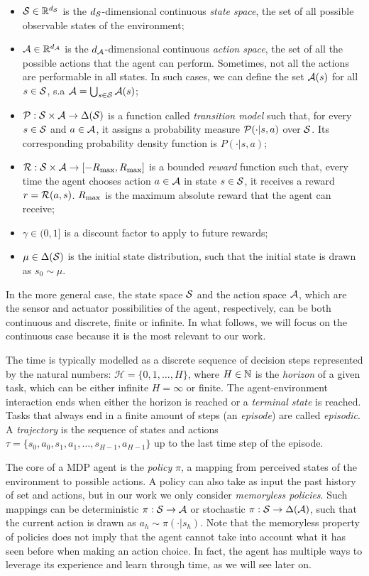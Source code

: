 \begin{itemize}
\item $\mathcal{S}\in\mathbb{R}^{d_{\mathcal{S}}}$ is the $d_{\mathcal{S}}$-dimensional continuous \emph{state space}, \ie the set of all possible observable states of the environment;
\item $\mathcal{A}\in\mathbb{R}^{d_{\mathcal{A}}}$ is the $d_{\mathcal{A}}$-dimensional continuous \emph{action space}, \ie the set of all the possible actions that the agent can perform. Sometimes, not all the actions are performable in all states. In such cases, we can define the set $\mathcal{A}(s)$ for all $s \in \mathcal{S}$, s.a  $\mathcal{A} = \bigcup_{s \in \mathcal{S}} \mathcal{A}(s)$;
\item  $\mathcal{P}:\mathcal{S}\times\mathcal{A}\to\Delta(\mathcal{S})$ is a function called \emph{transition model} such that, for every $s\in\mathcal{S}$ and $a\in\mathcal{A}$, it assigns a probability measure $\mathcal{P}(\cdot|s,a)$ over $\mathcal{S}$. Its corresponding probability density function is $P(\cdot|s,a)$;
\item $\mathcal{R}:\mathcal{S}\times\mathcal{A}\to[-R_{\max},R_{\max}]$ is a bounded \emph{reward} function such that, every time the agent chooses action $a\in\mathcal{A}$ in state $s\in\mathcal{S}$, it receives a reward $r = \mathcal{R}(a, s)$. $R_{\max}$ is the maximum absolute reward that the agent can receive;
\item $\gamma\in(0,1]$ is a discount factor to apply to future rewards;
\item $\mu\in\Delta(\mathcal{S})$ is the initial state distribution, such that the initial state is drawn as $s_0\sim\mu$.
\end{itemize}

In the more general case, the state space $\mathcal{S}$ and the action space $\mathcal{A}$, which are the sensor and actuator possibilities of the agent, respectively, can be both continuous and discrete, finite or infinite. In what follows, we will focus on the continuous case because it is the most relevant to our work.

The time is typically modelled as a discrete sequence of decision steps represented by the natural numbers: $\mathcal{H} = \{0, 1, \dots, H\}$, where $H\in\mathbb{N}$ is the \emph{horizon} of a given task, which can be either infinite $H = \infty$ or finite. The agent-environment interaction ends when either the horizon is reached or a \emph{terminal state} is reached. Tasks that always end in a finite amount of steps (an \emph{episode}) are called \emph{episodic}. A \emph{trajectory} is the sequence of states and actions $\tau=\{s_0,a_0,s_1,a_1,\dots,s_{H-1},a_{H-1}\}$ up to the last time step of the episode.

The core of a \gls{MDP} agent is the \emph{policy} $\pi$, a mapping from perceived states of the environment to possible actions. A policy can also take as input the past history of set and actions, but in our work we only consider \emph{memoryless policies}. Such mappings can be deterministic $\pi:\mathcal{S}\to\mathcal{A}$ or stochastic $\pi:\mathcal{S}\to\Delta(\mathcal{A})$, such that the current action is drawn as $a_h\sim\pi(\cdot|s_h)$. Note that the memoryless property of policies does not imply that the agent cannot take into account what it has seen before when making an action choice. In fact, the agent has multiple ways to leverage its experience and learn through time, as we will see later on. 